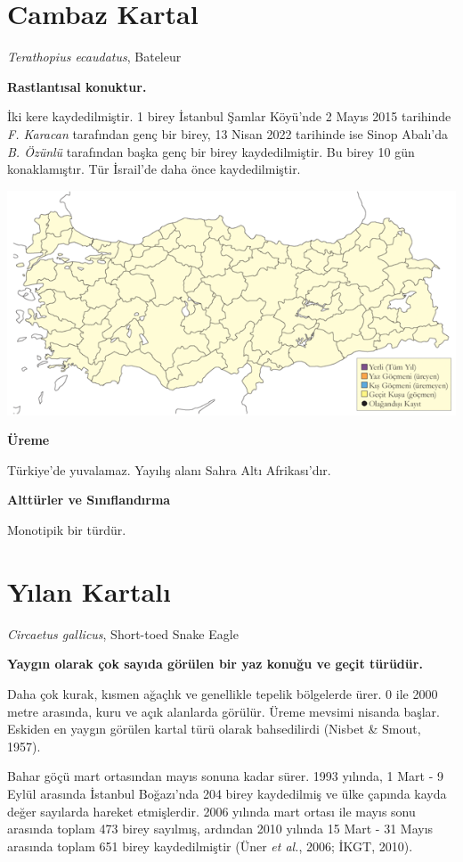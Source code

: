 \documentclass[
  a4paper,
  DIV=11,
  numbers=noendperiod]{scrreprt}
\begin{document}
\section{Cambaz Kartal}\label{cambaz-kartal}

\emph{Terathopius ecaudatus}, Bateleur

\textbf{Rastlantısal konuktur.}

İki kere kaydedilmiştir. 1 birey İstanbul Şamlar Köyü'nde 2 Mayıs 2015
tarihinde \emph{F. Karacan} tarafından genç bir birey, 13 Nisan 2022
tarihinde ise Sinop Abalı'da \emph{B. Özünlü} tarafından başka genç bir
birey kaydedilmiştir. Bu birey 10 gün konaklamıştır. Tür İsrail'de daha
önce kaydedilmiştir.

\includegraphics{images/harita_Page_090.png}

\textbf{Üreme}

Türkiye'de yuvalamaz. Yayılış alanı Sahra Altı Afrikası'dır.

\textbf{Alttürler ve Sınıflandırma}

Monotipik bir türdür.

\section{Yılan Kartalı}\label{yux131lan-kartalux131}

\emph{Circaetus gallicus}, Short-toed Snake Eagle

\textbf{Yaygın olarak çok sayıda görülen bir yaz konuğu ve geçit
türüdür.}

Daha çok kurak, kısmen ağaçlık ve genellikle tepelik bölgelerde ürer. 0
ile 2000 metre arasında, kuru ve açık alanlarda görülür. Üreme mevsimi
nisanda başlar. Eskiden en yaygın görülen kartal türü olarak
bahsedilirdi (Nisbet \& Smout, 1957).

Bahar göçü mart ortasından mayıs sonuna kadar sürer. 1993 yılında, 1
Mart - 9 Eylül arasında İstanbul Boğazı'nda 204 birey kaydedilmiş ve
ülke çapında kayda değer sayılarda hareket etmişlerdir. 2006 yılında
mart ortası ile mayıs sonu arasında toplam 473 birey sayılmış, ardından
2010 yılında 15 Mart - 31 Mayıs arasında toplam 651 birey kaydedilmiştir
(Üner \emph{et al.}, 2006; İKGT, 2010).
\end{document}
